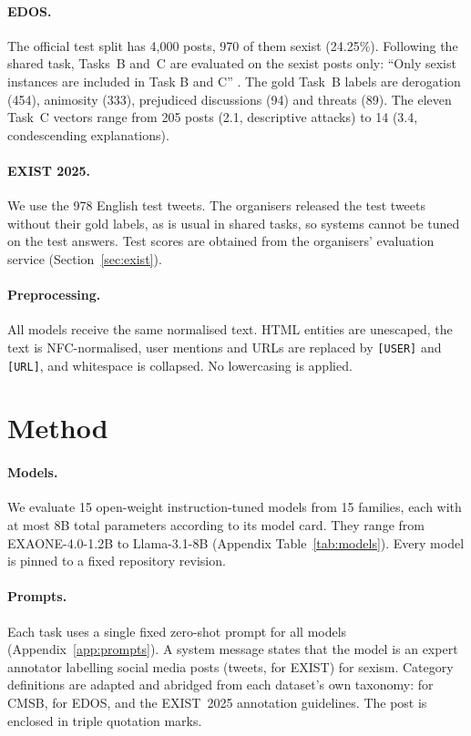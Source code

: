 \documentclass[11pt]{article}
\begin{document}
\paragraph{EDOS.} The official test split has 4{,}000 posts, 970 of them sexist (24.25\%). Following the shared task, Tasks~B and~C are evaluated on the sexist posts only: ``Only sexist instances are included in Task B and C'' \citep{kirk2023semeval}. The gold Task~B labels are derogation (454), animosity (333), prejudiced discussions (94) and threats (89). The eleven Task~C vectors range from 205 posts (2.1, descriptive attacks) to 14 (3.4, condescending explanations).

\paragraph{EXIST 2025.} We use the 978 English test tweets. The organisers released the test tweets without their gold labels, as is usual in shared tasks, so systems cannot be tuned on the test answers. Test scores are obtained from the organisers' evaluation service (Section~\ref{sec:exist}).

\paragraph{Preprocessing.} All models receive the same normalised text. HTML entities are unescaped, the text is NFC-normalised, user mentions and URLs are replaced by \texttt{[USER]} and \texttt{[URL]}, and whitespace is collapsed. No lowercasing is applied.

\section{Method}\label{sec:method}
\paragraph{Models.} We evaluate 15 open-weight instruction-tuned models from 15 families, each with at most 8B total parameters according to its model card. They range from EXAONE-4.0-1.2B to Llama-3.1-8B (Appendix Table~\ref{tab:models}). Every model is pinned to a fixed repository revision.

\paragraph{Prompts.} Each task uses a single fixed zero-shot prompt for all models (Appendix~\ref{app:prompts}). A system message states that the model is an expert annotator labelling social media posts (tweets, for EXIST) for sexism. Category definitions are adapted and abridged from each dataset's own taxonomy: \citet{samory2021callme} for CMSB, \citet{kirk2023semeval} for EDOS, and the EXIST~2025 annotation guidelines. The post is enclosed in triple quotation marks.
\end{document}
